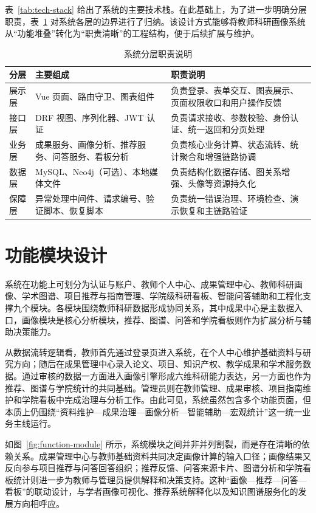\documentclass[12pt,a4paper]{ctexbook}
\begin{document}
表~\ref{tab:tech-stack} 给出了系统的主要技术栈。在此基础上，为了进一步明确分层职责，表~\ref{tab:architecture-layers} 对系统各层的边界进行了归纳。该设计方式能够将教师科研画像系统从“功能堆叠”转化为“职责清晰”的工程结构，便于后续扩展与维护。

\begin{table}[H]
  \centering
  \caption{系统分层职责说明}
  \label{tab:architecture-layers}
  \begin{tabular}{p{2.2cm}p{3.3cm}p{6cm}}
    \toprule
    分层 & 主要组成 & 职责说明 \\
    \midrule
    展示层 & Vue 页面、路由守卫、图表组件 & 负责登录、表单交互、图表展示、页面权限收口和用户操作反馈 \\
    接口层 & DRF 视图、序列化器、JWT 认证 & 负责请求接收、参数校验、身份认证、统一返回和分页处理 \\
    业务层 & 成果服务、画像分析、推荐服务、问答服务、看板分析 & 负责核心业务计算、状态流转、统计聚合和增强链路协调 \\
    数据层 & MySQL、Neo4j（可选）、本地媒体文件 & 负责结构化数据存储、图关系增强、头像等资源持久化 \\
    保障层 & 异常处理中间件、请求编号、验证脚本、恢复脚本 & 负责统一错误治理、环境检查、演示恢复和主链路验证 \\
    \bottomrule
  \end{tabular}
\end{table}

\section{功能模块设计}
系统在功能上可划分为认证与账户、教师个人中心、成果管理中心、教师科研画像、学术图谱、项目推荐与指南管理、学院级科研看板、智能问答辅助和工程化支撑九个模块。各模块围绕教师科研数据形成协同关系，其中成果中心是主数据入口，画像模块是核心分析模块，推荐、图谱、问答和学院看板则作为扩展分析与辅助决策能力。

从数据流转逻辑看，教师首先通过登录页进入系统，在个人中心维护基础资料与研究方向；随后在成果管理中心录入论文、项目、知识产权、教学成果和学术服务数据。通过审核的数据一方面进入画像引擎形成六维科研能力表达，另一方面也作为推荐、图谱与学院统计的共同基础。管理员则在教师管理、成果审核、项目指南维护和学院看板中完成治理与分析工作。由此可见，系统虽然包含多个功能页面，但本质上仍围绕“资料维护—成果治理—画像分析—智能辅助—宏观统计”这一统一业务主线运行。

如图~\ref{fig:function-module} 所示，系统模块之间并非并列割裂，而是存在清晰的依赖关系。成果管理中心与教师基础资料共同决定画像计算的输入口径；画像结果又反向参与项目推荐与问答回答组织；推荐反馈、问答来源卡片、图谱分析和学院看板统计则进一步为教师与管理员提供解释和决策支持。这种“画像—推荐—问答—看板”的联动设计，与学者画像可视化、推荐系统解释化以及知识图谱服务化的发展方向相呼应\cite{scholar_visualization_2020}\cite{recsys_survey_cn_2022}\cite{academic_kg_service_2018}。
\end{document}
